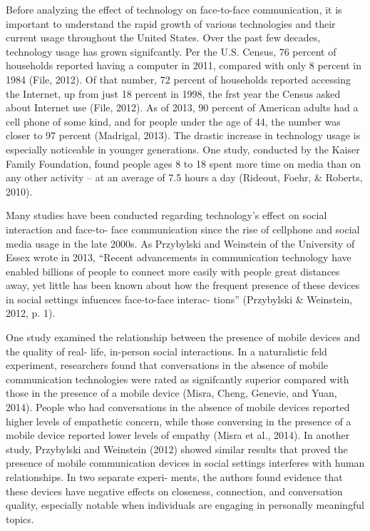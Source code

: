 \documentclass[11pt]{article} %
\begin{document}
Before analyzing the effect of technology on face-to-face communication, it is important to understand 
the rapid growth of various technologies and their current usage throughout the United States. Over the past 
few decades, technology usage has grown signifcantly. Per the U.S. Census, 76 percent of households reported 
having a computer in 2011, compared with only 8 percent in 1984 (File, 2012). Of that number, 72 percent of households 
reported accessing the Internet, up from just 18 percent in 1998, the frst year the Census asked about Internet use 
(File, 2012). As of 2013, 90 percent of American adults had a cell phone of some kind, and for people under the age 
of 44, the number was closer to 97 percent (Madrigal, 2013). The drastic increase in technology usage is especially 
noticeable in younger generations. One study, conducted by the Kaiser Family Foundation, found people 
ages 8 to 18 spent more time on media than on any other activity – at an average of 7.5 hours a day (Rideout, 
Foehr, & Roberts, 2010).

Many studies have been conducted regarding technology’s effect on social interaction and face-to-
face communication since the rise of cellphone and social media usage in the late 2000s. As Przybylski and 
Weinstein of the University of Essex wrote in 2013, “Recent advancements in communication technology 
have enabled billions of people to connect more easily with people great distances away, yet little has been 
known about how the frequent presence of these devices in social settings infuences face-to-face interac-
tions” (Przybylski & Weinstein, 2012, p. 1).

One study examined the relationship between the presence of mobile devices and the quality of real-
life, in-person social interactions. In a naturalistic feld experiment, researchers found that conversations in 
the absence of mobile communication technologies were rated as signifcantly superior compared with those 
in the presence of a mobile device (Misra, Cheng, Genevie, and Yuan, 2014). People who had conversations 
in the absence of mobile devices reported higher levels of empathetic concern, while those conversing in the 
presence of a mobile device reported lower levels of empathy (Misra et al., 2014). 
In another study, Przybylski and Weinstein (2012) showed similar results that proved the presence of 
mobile communication devices in social settings interferes with human relationships. In two separate experi-
ments, the authors found evidence that these devices have negative effects on closeness, connection, and 
conversation quality, especially notable when individuals are engaging in personally meaningful topics.  
\end{document}
